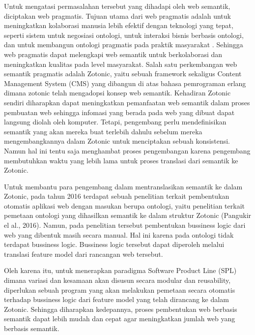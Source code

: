 Untuk mengatasi permasalahan tersebut yang dihadapi oleh web semantik, diciptakan web pragmatis. Tujuan utama dari web pragmatis adalah untuk meningkatkan kolaborasi manusia lebih efektif dengan teknologi yang tepat, seperti sistem untuk negosiasi ontologi, untuk interaksi bisnis berbasis ontologi, dan untuk membangun ontologi pragmatis pada praktik masyarakat \citep{pragmatic.web}. Sehingga web pragmatis dapat melengkapi web semantik untuk berkolaborasi dan meningkatkan kualitas pada level masyarakat. Salah satu perkembangan web semantik pragmatis adalah Zotonic, yaitu sebuah framework sekaligus Content Management System (CMS) yang dibangun di atas bahasa pemrograman erlang dimana zotonic telah mengadopsi konsep web semantik. Kehadiran Zotonic sendiri diharapkan dapat meningkatkan pemanfaatan web semantik dalam proses pembuatan web sehingga infomasi yang berada pada web yang dibuat dapat langsung diolah oleh komputer. Tetapi, pengembang perlu mendefinisikan semantik yang akan mereka buat terlebih dahulu sebelum mereka mengembangkannya dalam Zotonic untuk menciptakan sebuah konsistensi. Namun hal ini tentu saja menghambat proses pengembangan karena pengembang membutuhkan waktu yang lebih lama untuk proses translasi dari semantik ke Zotonic.

Untuk membantu para pengembang dalam mentranslasikan semantik ke dalam Zotonic, pada tahun 2016 terdapat sebuah penelitian terkait pembentukan otomatis aplikasi web dengan masukan berupa ontologi, yaitu penelitian terkait pemetaan ontologi yang dihasilkan semantik ke dalam struktur Zotonic (Pangukir el al., 2016). Namun, pada penelitian tersebut pembentukan bussiness logic dari web yang dibentuk masih secara manual. Hal ini karena pada ontologi tidak terdapat bussiness logic. Bussiness logic tersebut dapat diperoleh melalui translasi feature model dari rancangan web tersebut.

Oleh karena itu, untuk menerapkan paradigma Software Product Line (SPL) dimana variasi dan kesamaan akan disusun secara modular dan reusability, diperlukan sebuah program yang akan melakukan pemetaan secara otomatis terhadap bussiness logic dari feature model yang telah dirancang ke dalam Zotonic. Sehingga diharapkan kedepannya, proses pembentukan web berbasis semantik dapat lebih mudah dan cepat agar meningkatkan jumlah web yang berbasis semantik. \\


